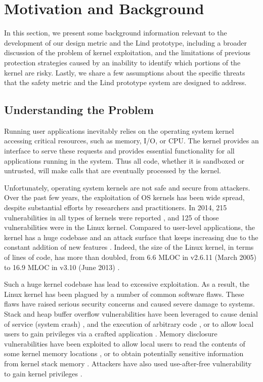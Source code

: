 \section{Motivation and Background}
\label{sec.motivation-and-background}

In this section, we present some background information 
relevant to the development of our design metric and the Lind prototype, 
including a broader discussion of the problem of kernel exploitation, 
and the limitations of previous protection strategies caused by 
an inability to identify which portions of the kernel are risky. 
Lastly, we share a few assumptions about the specific threats 
that the safety metric and the Lind prototype system are designed to address.

\subsection{Understanding the Problem}

Running user applications inevitably relies on the operating system kernel 
accessing critical resources, such as memory, I/O, or CPU. 
The kernel provides an interface to serve these requests 
and provides essential functionality for all applications running in the system. 
Thus all code, whether it is sandboxed or untrusted, will make calls 
that are eventually processed by the kernel. 

Unfortunately, operating system kernels are not safe and secure from attackers. 
Over the past few years, the exploitation of OS kernels has been wide spread, 
despite substantial efforts by researchers and practitioners. 
In 2014, 215 vulnerabilities in all types of kernels were reported \cite{NVD}, 
and 125 of those  vulnerabilities were in the Linux kernel. 
Compared to user-level applications, the kernel has a huge codebase and 
an attack surface that keeps increasing due to the constant addition of new features \cite{Metrics-13}. 
Indeed, the size of the Linux kernel, in terms of lines of code, 
has more than doubled, from 6.6 MLOC in v2.6.11 (March 2005) to 16.9 MLOC in v3.10 (June 2013) \cite{Linux-13}. 

Such a huge kernel codebase has lead to excessive exploitation. 
As a result, the Linux kernel has been plagued by a number of common software flaws. 
These flaws have raised serious security concerns and caused severe damage to systems. 
Stack and heap buffer overflow vulnerabilities have been leveraged to 
cause denial of service (system crash) \cite{CVE-2009-3234}, \cite{CVE-2013-2892} and the execution of arbitrary code \cite{CVE-2009-3234}, 
or to allow local users to gain privileges via a crafted application \cite{CVE-2013-1828}. 
Memory disclosure vulnerabilities have been exploited to allow local users to read 
the contents of some kernel memory locations \cite{CVE-2009-3002}, or to obtain potentially 
sensitive information from kernel stack memory \cite{CVE-2010-4073}. 
Attackers have also used use-after-free vulnerability to gain kernel privileges \cite{CVE-2013-4343}.

